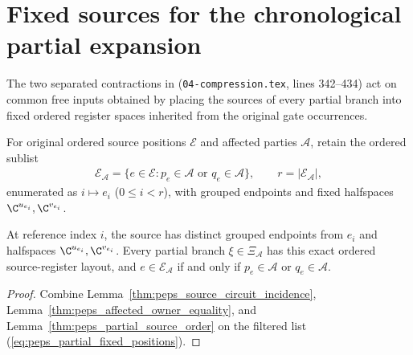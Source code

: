 \section{Fixed sources for the chronological partial expansion}

The two separated contractions in \cite[proof of Theorem~5.2]{OpenAI2026PolynomialPEPS} (\texttt{04-compression.tex}, lines 342--434) act on common free inputs obtained by placing the sources of every partial branch into fixed ordered register spaces inherited from the original gate occurrences.

\begin{definition}
    \label{def:peps_partial_fixed_positions}
    \leanok
    For original ordered source positions $\mathcal E$ and affected parties $\mathcal A$, retain the ordered sublist
    \begin{align}
        \mathcal E_{\mathcal A}
        =\{e\in\mathcal E:
        p_e\in\mathcal A\text{ or }q_e\in\mathcal A\},
        \qquad r=|\mathcal E_{\mathcal A}|,
        \label{eq:peps_partial_fixed_positions}
    \end{align}
    enumerated as $i\mapsto e_i$ ($0\le i<r$), with grouped endpoints and fixed halfspaces $\C^{u_{e_i}},\C^{v_{e_i}}$.
\end{definition}

\begin{lemma}
    \label{thm:peps_partial_fixed_layout}
    \leanok
    At reference index $i$, the source has distinct grouped endpoints from $e_i$ and halfspaces $\C^{u_{e_i}},\C^{v_{e_i}}$. Every partial branch $\xi\in\Xi_{\mathcal A}$ has this exact ordered source-register layout, and $e\in\mathcal E_{\mathcal A}$ if and only if $p_e\in\mathcal A$ or $q_e\in\mathcal A$.
\end{lemma}
\begin{proof}
    \leanok
    Combine Lemma~\ref{thm:peps_source_circuit_incidence}, Lemma~\ref{thm:peps_affected_owner_equality}, and Lemma~\ref{thm:peps_partial_source_order} on the filtered list (\ref{eq:peps_partial_fixed_positions}).
\end{proof}

